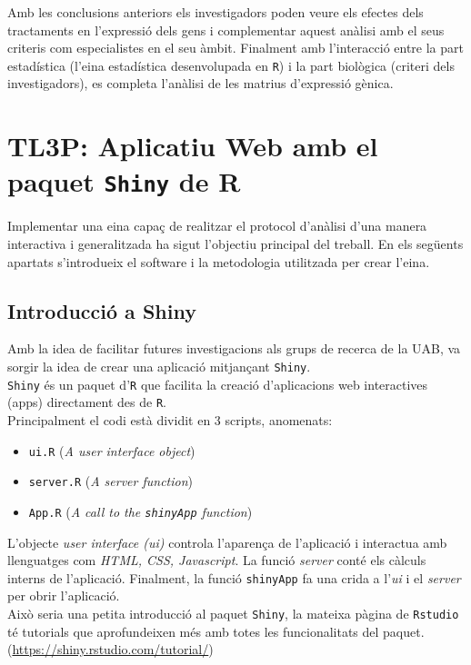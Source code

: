 \documentclass[english]{article}
\begin{document}
Amb les conclusions anteriors els investigadors poden veure els efectes dels tractaments en l'expressió dels gens i complementar aquest anàlisi amb el seus criteris com especialistes en el seu àmbit. Finalment amb l'interacció entre la part estadística (l'eina estadística desenvolupada en \texttt{R}) i la part biològica (criteri dels investigadors), es completa l'anàlisi de les matrius d'expressió gènica.
\clearpage
\section{TL3P: Aplicatiu Web amb el paquet \texttt{Shiny} de R}
Implementar una eina capa\c{c} de realitzar el protocol d'anàlisi d'una manera interactiva i generalitzada ha sigut l'objectiu principal del treball. En els següents apartats s'introdueix el software i la metodologia utilitzada per crear l'eina.
\subsection{Introducció a Shiny}
Amb la idea de facilitar futures investigacions als grups de recerca de la UAB, va sorgir la idea de crear una aplicació mitjan\c{c}ant \texttt{Shiny}.
\\

\texttt{Shiny} és un paquet d'\texttt{R} que facilita la creació d'aplicacions web interactives (apps) directament des de \texttt{R}.
\\

Principalment el codi està dividit en 3 scripts, anomenats:
\begin{itemize}
\item \texttt{ui.R} (\textit{A user interface object})
\item \texttt{server.R} (\textit{A server function})
\item \texttt{App.R} (\textit{A call to the \texttt{shinyApp} function})
\end{itemize}
L'objecte \textit{user interface (ui)} controla l'aparen\c{c}a de l'aplicació i interactua amb llenguatges com \textit{HTML, CSS, Javascript}. La funció \textit{server} conté els càlculs interns de l'aplicació. Finalment, la funció \texttt{shinyApp} fa una crida a l'\textit{ui} i el \textit{server} per obrir l'aplicació.
\\

Això seria una petita introducció al paquet \texttt{Shiny}, la mateixa pàgina de \texttt{Rstudio} té tutorials que aprofundeixen més amb totes les funcionalitats del paquet. (\url{https://shiny.rstudio.com/tutorial/})
\end{document}
